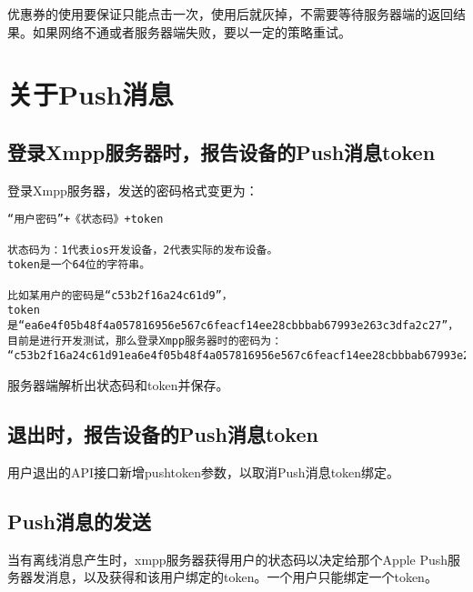 优惠券的使用要保证只能点击一次，使用后就灰掉，不需要等待服务器端的返回结果。如果网络不通或者服务器端失败，要以一定的策略重试。






\section{关于Push消息}

\subsection{登录Xmpp服务器时，报告设备的Push消息token}
登录Xmpp服务器，发送的密码格式变更为：

\begin{verbatim}
“用户密码”+《状态码》+token

状态码为：1代表ios开发设备，2代表实际的发布设备。
token是一个64位的字符串。

比如某用户的密码是“c53b2f16a24c61d9”，
token是“ea6e4f05b48f4a057816956e567c6feacf14ee28cbbbab67993e263c3dfa2c27”，
目前是进行开发测试，那么登录Xmpp服务器时的密码为：
“c53b2f16a24c61d91ea6e4f05b48f4a057816956e567c6feacf14ee28cbbbab67993e263c3dfa2c27”。
\end{verbatim}

服务器端解析出状态码和token并保存。


\subsection{退出时，报告设备的Push消息token}

用户退出的API接口新增pushtoken参数，以取消Push消息token绑定。

\subsection{Push消息的发送}
当有离线消息产生时，xmpp服务器获得用户的状态码以决定给那个Apple Push服务器发消息，以及获得和该用户绑定的token。一个用户只能绑定一个token。
